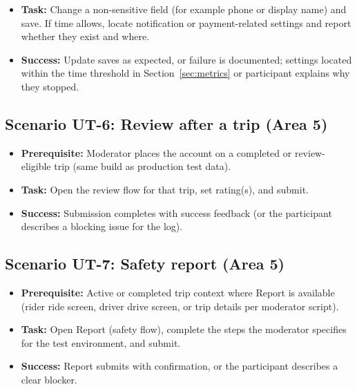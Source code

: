 \begin{itemize}
  \item \textbf{Task:} Change a non-sensitive field (for example phone or display name) and save. If time allows, locate notification or payment-related settings and report whether they exist and where.
  \item \textbf{Success:} Update saves as expected, or failure is documented; settings located within the time threshold in Section~\ref{sec:metrics} or participant explains why they stopped.
\end{itemize}

\subsection{Scenario UT-6: Review after a trip (Area 5)}

\begin{itemize}
  \item \textbf{Prerequisite:} Moderator places the account on a completed or review-eligible trip (same build as production test data).
  \item \textbf{Task:} Open the review flow for that trip, set rating(s), and submit.
  \item \textbf{Success:} Submission completes with success feedback (or the participant describes a blocking issue for the log).
\end{itemize}

\subsection{Scenario UT-7: Safety report (Area 5)}

\begin{itemize}
  \item \textbf{Prerequisite:} Active or completed trip context where Report is available (rider ride screen, driver drive screen, or trip details per moderator script).
  \item \textbf{Task:} Open Report (safety flow), complete the steps the moderator specifies for the test environment, and submit.
  \item \textbf{Success:} Report submits with confirmation, or the participant describes a clear blocker.
\end{itemize}

